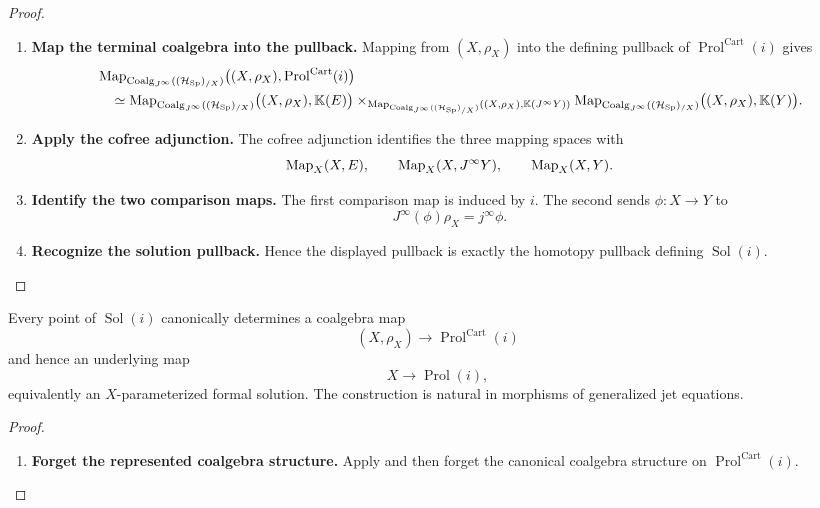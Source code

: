 \begin{proof}
\leavevmode
\begin{enumerate}[label=\textup{(\arabic*)}]
    \item \textbf{Map the terminal coalgebra into the pullback.}
Mapping from \((X,\rho_X)\) into the defining pullback of \(\operatorname{Prol}^{\mathrm{Cart}}(i)\) gives
\[
\begin{aligned}
  &\operatorname{Map}_{\operatorname{Coalg}_{J^\infty}((\mathcal H_{\operatorname{Sp}})_{/X})}
  \bigl((X,\rho_X),\operatorname{Prol}^{\mathrm{Cart}}(i)\bigr)\\
  &\quad\simeq
  \operatorname{Map}_{\operatorname{Coalg}_{J^\infty}((\mathcal H_{\operatorname{Sp}})_{/X})}
  \bigl((X,\rho_X),\mathbb K(E)\bigr)
  \times_{\operatorname{Map}_{\operatorname{Coalg}_{J^\infty}((\mathcal H_{\operatorname{Sp}})_{/X})}
  ((X,\rho_X),\mathbb K(J^\infty Y))}
  \operatorname{Map}_{\operatorname{Coalg}_{J^\infty}((\mathcal H_{\operatorname{Sp}})_{/X})}
  \bigl((X,\rho_X),\mathbb K(Y)\bigr).
\end{aligned}
\]

    \item \textbf{Apply the cofree adjunction.}
The cofree adjunction identifies the three mapping spaces with
\[
  \operatorname{Map}_X(X,E),
  \qquad
  \operatorname{Map}_X(X,J^\infty Y),
  \qquad
  \operatorname{Map}_X(X,Y).
\]

    \item \textbf{Identify the two comparison maps.}
The first comparison map is induced by \(i\). The second sends
\(\phi:X\to Y\) to
\[
  J^\infty(\phi)\rho_X=j^\infty\phi.
\]

    \item \textbf{Recognize the solution pullback.}
Hence the displayed pullback is exactly the homotopy pullback defining
\(\operatorname{Sol}(i)\).
\end{enumerate}
\end{proof}

\begin{corollary}
\label{prop:actual-to-formal-solutions}
Every point of \(\operatorname{Sol}(i)\) canonically determines a coalgebra map
\[
  (X,\rho_X)\longrightarrow \operatorname{Prol}^{\mathrm{Cart}}(i)
\]
and hence an underlying map
\[
  X\longrightarrow \operatorname{Prol}(i),
\]
equivalently an \(X\)-parameterized formal solution. The construction is
natural in morphisms of generalized jet equations.
\end{corollary}

\begin{proof}
\leavevmode
\begin{enumerate}[label=\textup{(\arabic*)}]
    \item \textbf{Forget the represented coalgebra structure.}
Apply  and then forget the canonical
coalgebra structure on \(\operatorname{Prol}^{\mathrm{Cart}}(i)\).
\end{enumerate}
\end{proof}

